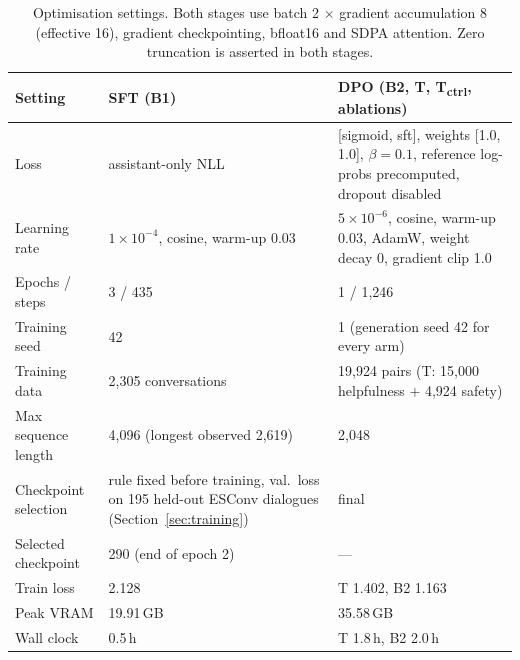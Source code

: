 \documentclass[10pt]{article} %
\newcommand{\Bo}{B1}
\newcommand{\Bt}{B2}
\newcommand{\T}{T}
\newcommand{\Tctrl}{T\textsubscript{ctrl}}
\begin{document}
\begin{table}[H]
\caption{Optimisation settings. Both stages use batch 2 $\times$ gradient accumulation 8 (effective 16), gradient checkpointing, bfloat16 and SDPA attention. Zero truncation is asserted in both stages.}
\label{tab:hparams}
\begin{center}
\small
\begin{tabular}{lp{5.2cm}p{5.2cm}}
\toprule
Setting & SFT (\Bo) & DPO (\Bt, \T, \Tctrl, ablations) \\
\midrule
Loss & assistant-only NLL & [sigmoid, sft], weights [1.0, 1.0], $\beta=0.1$, reference log-probs precomputed, dropout disabled \\
Learning rate & $1\times10^{-4}$, cosine, warm-up 0.03 & $5\times10^{-6}$, cosine, warm-up 0.03, AdamW, weight decay 0, gradient clip 1.0 \\
Epochs / steps & 3 / 435 & 1 / 1,246 \\
Training seed & 42 & 1 (generation seed 42 for every arm) \\
Training data & 2,305 conversations & 19,924 pairs (\T{}: 15,000 helpfulness $+$ 4,924 safety) \\
Max sequence length & 4,096 (longest observed 2,619) & 2,048 \\
Checkpoint selection & rule fixed before training, val.\ loss on 195 held-out ESConv dialogues (Section~\ref{sec:training}) & final \\
Selected checkpoint & 290 (end of epoch 2) & --- \\
Train loss & 2.128 & \T{} 1.402, \Bt{} 1.163 \\
Peak VRAM & 19.91\,GB & 35.58\,GB \\
Wall clock & 0.5\,h & \T{} 1.8\,h, \Bt{} 2.0\,h \\
\bottomrule
\end{tabular}
\end{center}
\end{table}
\end{document}

